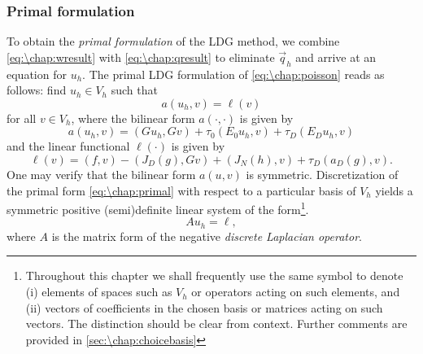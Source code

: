 \subsubsection{Primal formulation}
To obtain the \emph{primal formulation} of the LDG method, we combine \cref{eq:\chap:wresult} with \cref{eq:\chap:qresult} to eliminate $\vec{q}_h$ and arrive at an equation for $u_h$. The primal LDG formulation of \cref{eq:\chap:poisson} reads as follows: find $u_h \in V_h$ such that
\begin{equation}\label{eq:\chap:primal}
a(u_h,v) = \ell(v)
\end{equation}
for all $v \in V_h$, where the bilinear form $a(\cdot,\cdot)$ is given by
\[
a(u_h,v) = (Gu_h, Gv) + \tau_0 (E_0 u_h, v) + \tau_D (E_D u_h, v)
\]
and the linear functional $\ell(\cdot)$ is given by
\[
\ell(v) = (f, v) - (J_D(g), Gv) + (J_N(h), v) + \tau_D (a_D(g), v).
\]
One may verify that the bilinear form $a(u,v)$ is symmetric. Discretization of the primal form \cref{eq:\chap:primal} with respect to a particular basis of $V_h$ yields a symmetric positive (semi)definite linear system of the form\footnote{Throughout this chapter we shall frequently use the same symbol to denote (i) elements of spaces such as $V_h$ or operators acting on such elements, and (ii) vectors of coefficients in the chosen basis or matrices acting on such vectors. The distinction should be clear from context. Further comments are provided in \cref{sec:\chap:choicebasis}}.
\begin{equation}\label{eq:\chap:primal_disc}
A u_h = \ell,
\end{equation}
where $A$ is the matrix form of the negative \emph{discrete Laplacian operator}.

